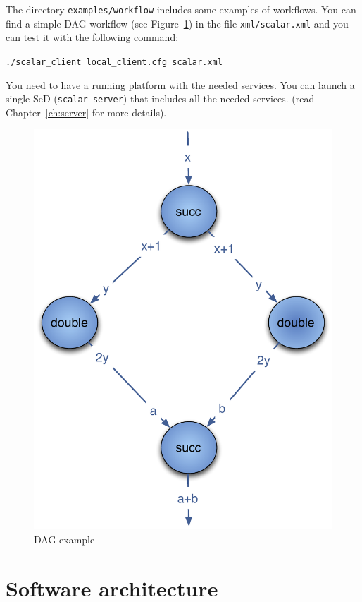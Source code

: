 The directory \texttt{examples/workflow} includes some examples of
workflows.  You can find a simple DAG workflow (see
Figure~\ref{fig:example1}) in the file \texttt{xml/scalar.xml} and you
can test it with the following command:

\verb|./scalar_client local_client.cfg scalar.xml |


You need to have a running \diet platform with the needed services. You
can launch a single SeD (\texttt{scalar\_server}) that includes all the
needed services. (read Chapter~\ref{ch:server} for more details).

\begin{figure}[htbp]
  \centering
  \includegraphics[keepaspectratio,width=0.4\linewidth]{fig/wf_example1}
  \caption{DAG example}
  \label{fig:example1}
\end{figure}

\section{Software architecture}


